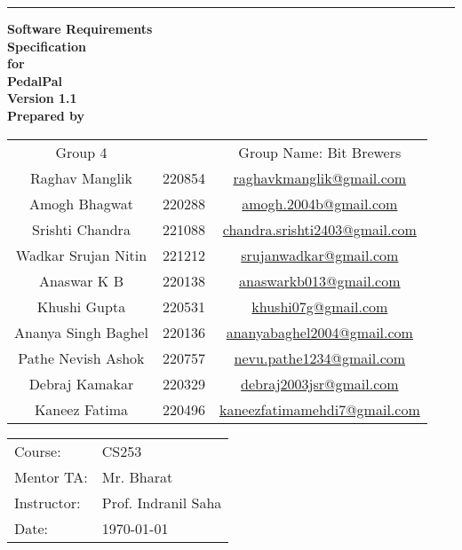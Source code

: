 \documentclass{scrreprt}
\begin{document}
\begin{flushright}
    \rule{16cm}{5pt}\vskip1cm
    \textbf{{\fontsize{40}{48}\selectfont Software Requirements}\\ {\fontsize{40}{48}\selectfont Specification}\\\vspace{1cm}\huge{for}\\\vspace{1cm}\Huge{PedalPal}\\ \vspace{1.5cm}\huge{Version 1.1}\\\vspace{1cm}\huge{Prepared by}}
\end{flushright}
\vspace{1.0cm}
\large{\begin{tabular*}{\columnwidth}{@{\extracolsep{\stretch{1}}}*{3}{c}@{}}
    \Large{Group 4} & & \Large{Group Name: Bit Brewers} \\
    Raghav Manglik & 220854 & \href{mailto:raghavkmanglik@gmail.com}{raghavkmanglik@gmail.com} \\
    Amogh Bhagwat & 220288 & \href{mailto:amogh.2004b@gmail.com}{amogh.2004b@gmail.com} \\
    Srishti Chandra & 221088 & \href{mailto:chandra.srishti2403@gmail.com}{chandra.srishti2403@gmail.com} \\
    Wadkar Srujan Nitin & 221212 & \href{mailto:srujanwadkar@gmail.com}{srujanwadkar@gmail.com} \\
    Anaswar K B & 220138 & \href{mailto:anaswarkb013@gmail.com}{anaswarkb013@gmail.com} \\
    Khushi Gupta & 220531 & \href{mailto:khushi07g@gmail.com}{khushi07g@gmail.com} \\
    Ananya Singh Baghel & 220136 & \href{mailto:ananyabaghel2004@gmail.com}{ananyabaghel2004@gmail.com} \\
    Pathe Nevish Ashok & 220757 & \href{mailto:nevu.pathe1234@gmail.com}{nevu.pathe1234@gmail.com} \\
    Debraj Kamakar & 220329 & \href{mailto:debraj2003jsr@gmail.com}{debraj2003jsr@gmail.com} \\
    Kaneez Fatima & 220496 & \href{mailto:kaneezfatimamehdi7@gmail.com}{kaneezfatimamehdi7@gmail.com} \\
    
\end{tabular*}}

\vspace{2.0cm}
\begin{center}
\large{
\begin{tabular}{l l}
    Course: & CS253 \\
    Mentor TA: & Mr. Bharat \\
    Instructor: & Prof. Indranil Saha \\
    Date: & \today
\end{tabular}
}
\end{center}
\end{document}
